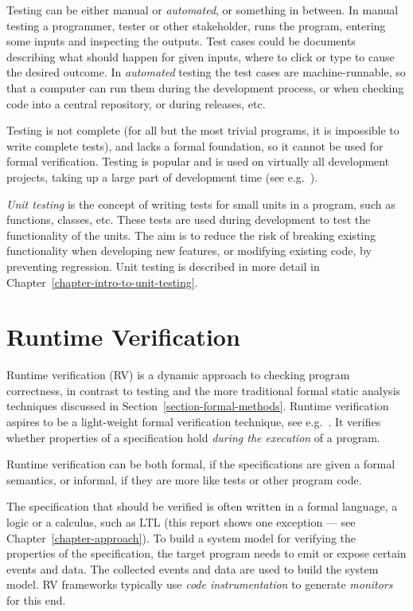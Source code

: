 \documentclass[a4paper,11pt]{kth-mag}
\begin{document}
Testing can be either manual or \textit{automated}, or something in between. In
manual testing a programmer, tester or other stakeholder, runs the program,
entering some inputs and inspecting the outputs. Test cases could be documents
describing what should happen for given inputs, where to click or type to cause
the desired outcome. In \textit{automated} testing the test cases are
machine-runnable, so that a computer can run them during the development
process, or when checking code into a central repository, or during releases,
etc.

Testing is not complete (for all but the most trivial programs, it is
impossible to write complete tests), and lacks a formal foundation, so it
cannot be used for formal verification. Testing is popular and is used on
virtually all development projects, taking up a large part of development time
(see e.g.\ \cite{brooks75mythicalmanmonth}).

\textit{Unit testing} is the concept of writing tests for small units in a
program, such as functions, classes, etc. These tests are used during
development to test the functionality of the units. The aim is to reduce the
risk of breaking existing functionality when developing new features, or
modifying existing code, by preventing regression. Unit testing is described in
more detail in Chapter~\ref{chapter-intro-to-unit-testing}.



\section{Runtime Verification} \label{section-rv}

Runtime verification (RV) is a dynamic approach to checking program
correctness, in contrast to testing and the more traditional formal static
analysis techniques discussed in Section~\ref{section-formal-methods}.  Runtime
verification aspires to be a light-weight formal verification technique, see
e.g.\ \cite{leucker09abriefaccount,delgado04taxonomy}. It verifies whether
properties of a specification hold \textit{during the execution} of a program.

Runtime verification can be both formal, if the specifications are given a
formal semantics, or informal, if they are more like tests or other program
code.

The specification that should be verified is often written in a formal
language, a logic or a calculus, such as LTL \cite{pnueli77} (this report shows
one exception --- see Chapter~\ref{chapter-approach}). To build a system model
for verifying the properties of the specification, the target program needs to
emit or expose certain events and data. The collected events and data are used
to build the system model. RV frameworks typically use \textit{code
instrumentation} to generate \textit{monitors} for this end.
\end{document}
